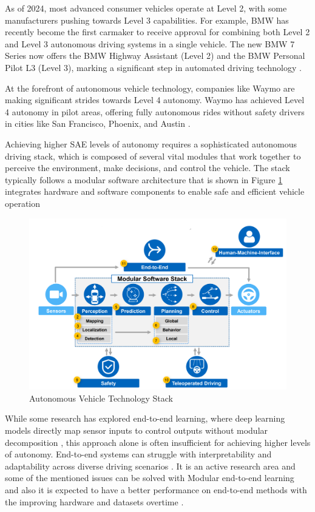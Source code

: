 As of 2024, most advanced consumer vehicles operate at Level 2, with some manufacturers pushing towards Level 3 capabilities. For example, BMW has recently become the first carmaker to receive approval for combining both Level 2 and Level 3 autonomous driving systems in a single vehicle. The new BMW 7 Series now offers the BMW Highway Assistant (Level 2) and the BMW Personal Pilot L3 (Level 3), marking a significant step in automated driving technology \cite{bmw2024}.

At the forefront of autonomous vehicle technology, companies like Waymo
are making significant strides towards Level 4 autonomy. Waymo has achieved
Level 4 autonomy in pilot areas, offering fully autonomous rides without safety
 drivers in cities like San Francisco, Phoenix, and Austin \cite{evmagazine2024}.

 Achieving higher SAE levels of autonomy requires a sophisticated autonomous driving stack,
 which is composed of several vital modules that work together to perceive the environment,
 make decisions, and control the vehicle. The stack typically follows a modular software
 architecture that is shown in Figure \ref{fig:AVStack} integrates hardware and software components to enable safe and
 efficient vehicle operation

\begin{figure}[h]
    \includegraphics[scale=0.14]{figures/AVStack.png}
    \centering
    \caption{Autonomous Vehicle Technology Stack} %
    \label{fig:AVStack}
\end{figure}

While some research has explored end-to-end learning, where deep learning models directly map sensor inputs
to control outputs without modular decomposition \cite{codevilla2019limitations}, this approach alone is often
insufficient for achieving higher levels of autonomy. End-to-end systems can struggle with interpretability
and adaptability across diverse driving scenarios \cite{e2e}. It is an active research area and some
of the mentioned issues can be solved with Modular end-to-end learning \cite{nvidia2022diffstack} and also
it is expected to have a better performance on end-to-end methods with the improving hardware and datasets overtime \cite{e2e}.

